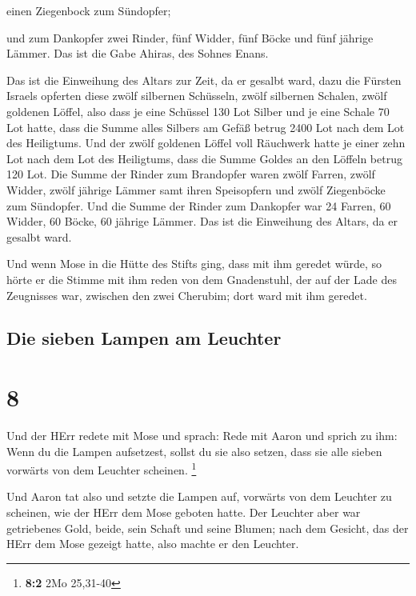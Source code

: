  einen Ziegenbock zum Sündopfer;

 und zum Dankopfer zwei Rinder, fünf Widder, fünf Böcke
und fünf jährige Lämmer. Das ist die Gabe Ahiras, des Sohnes Enans.

 Das ist die Einweihung des Altars zur Zeit, da er
gesalbt ward, dazu die Fürsten Israels opferten diese zwölf silbernen
Schüsseln, zwölf silbernen Schalen, zwölf goldenen Löffel,
 also dass je eine Schüssel 130 Lot Silber und je eine
Schale 70 Lot hatte, dass die Summe alles Silbers am Gefäß betrug 2400
Lot nach dem Lot des Heiligtums.  Und der zwölf goldenen
Löffel voll Räuchwerk hatte je einer zehn Lot nach dem Lot des
Heiligtums, dass die Summe Goldes an den Löffeln betrug 120 Lot.
 Die Summe der Rinder zum Brandopfer waren zwölf Farren,
zwölf Widder, zwölf jährige Lämmer samt ihren Speisopfern und zwölf
Ziegenböcke zum Sündopfer.  Und die Summe der Rinder zum
Dankopfer war 24 Farren, 60 Widder, 60 Böcke, 60 jährige Lämmer. Das ist
die Einweihung des Altars, da er gesalbt ward.

 Und wenn Mose in die Hütte des Stifts ging, dass mit ihm
geredet würde, so hörte er die Stimme mit ihm reden von dem Gnadenstuhl,
der auf der Lade des Zeugnisses war, zwischen den zwei Cherubim; dort
ward mit ihm geredet.

\hypertarget{die-sieben-lampen-am-leuchter}{%
\subsection{Die sieben Lampen am
Leuchter}\label{die-sieben-lampen-am-leuchter}}

\hypertarget{section-7}{%
\section{8}\label{section-7}}

 Und der HErr redete mit Mose und sprach: 
Rede mit Aaron und sprich zu ihm: Wenn du die Lampen aufsetzest, sollst
du sie also setzen, dass sie alle sieben vorwärts von dem Leuchter
scheinen. \footnote{\textbf{8:2} 2Mo 25,31-40}

 Und Aaron tat also und setzte die Lampen auf, vorwärts
von dem Leuchter zu scheinen, wie der HErr dem Mose geboten hatte.
 Der Leuchter aber war getriebenes Gold, beide, sein
Schaft und seine Blumen; nach dem Gesicht, das der HErr dem Mose gezeigt
hatte, also machte er den Leuchter.

